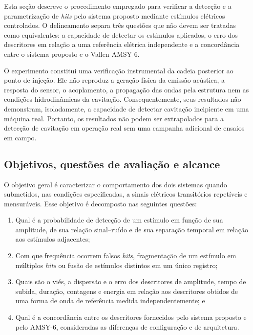 
Esta seção descreve o procedimento empregado para verificar a detecção e a parametrização de \textit{hits} pelo sistema proposto mediante estímulos elétricos controlados. O delineamento separa três questões que não devem ser tratadas como equivalentes: a capacidade de detectar os estímulos aplicados, o erro dos descritores em relação a uma referência elétrica independente e a concordância entre o sistema proposto e o Vallen AMSY-6.

O experimento constitui uma verificação instrumental da cadeia posterior ao ponto de injeção. Ele não reproduz a geração física da emissão acústica, a resposta do sensor, o acoplamento, a propagação das ondas pela estrutura nem as condições hidrodinâmicas da cavitação. Consequentemente, seus resultados não demonstram, isoladamente, a capacidade de detectar cavitação incipiente em uma máquina real. Portanto, os resultados não podem ser extrapolados para a detecção de cavitação em operação real sem uma campanha adicional de ensaios em campo.

\subsection{Objetivos, questões de avaliação e alcance}
\label{v2:subsec:objetivos_experimento}

O objetivo geral é caracterizar o comportamento dos dois sistemas quando submetidos, nas condições especificadas, a sinais elétricos transitórios repetíveis e mensuráveis. Esse objetivo é decomposto nas seguintes questões: 
\begin{enumerate}
	\item Qual é a probabilidade de detecção de um estímulo em função de sua amplitude, de sua relação sinal--ruído e de sua separação temporal em relação aos estímulos adjacentes;
	
	\item Com que frequência ocorrem falsos \textit{hits}, fragmentação de um estímulo em múltiplos \textit{hits} ou fusão de estímulos distintos em um único registro;
	
	\item Quais são o viés, a dispersão e o erro dos descritores de amplitude, tempo de subida, duração, contagens e energia em relação aos descritores obtidos de uma forma de onda de referência medida independentemente; e 
	
	\item Qual é a concordância entre os descritores fornecidos pelo sistema proposto e pelo AMSY-6, consideradas as diferenças de configuração e de arquitetura.
\end{enumerate}

